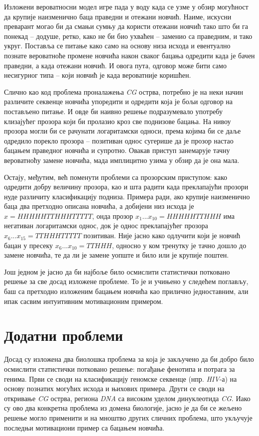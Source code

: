 \documentclass[12pt,oneside]{memoir}
\begin{document}
\begin{CJK}{UTF8}{ipxm}
Изложени вероватносни модел игре пада у воду када се узме у обзир могућност да крупије наизменично баца праведни и отежани новчић. Наиме, искусни преварант могао би да смањи сумњу да користи отежани новчић тако што би га понекад -- додуше, ретко, како не би био ухваћен -- заменио са праведним, и тако укруг. Поставља се питање како само на основу низа исхода и евентуално познате вероватноће промене новчића након сваког бацања одредити када је бачен праведни, а када отежани новчић. И овога пута, одговор може бити само несигурног типа -- који новчић је када вероватније коришћен.

Слично као код проблема проналажења \textit{CG} острва, потребно је на неки начин различите секвенце новчића упоредити и одредити која је бољи одговор на постављено питање. И овде би наивно решење подразумевало употребу клизајућег прозора који би пролазио кроз све поднизове бацања. На нивоу прозора могли би се рачунати логаритамски односи, према којима би се даље одредило порекло прозора -- позитиван однос сугерише да је прозор настао бацањем праведног новчића и супротно. Овакав приступ занемарује тачну вероватноћу замене новчића, мада имплицитно узима у обзир да је она мала.

Остају, међутим, већ поменути проблеми са прозорским приступом: како одредити добру величину прозора, као и шта радити када преклапајући прозори нуде различиту класификацију подниза. Примера ради, ако крупије наизменично баца два претходно описана новчића, а добијени низ исхода је $x = HHHHHTTHHHTTTTT$, онда прозор $x_1...x_{10} = HHHHHTTHHH$ има негативан логаритамски однос, док је однос преклапајућег прозора $x_6...x_{15} = TTHHHTTTTT$ позитиван. Није јасно како одлучити који је новчић бацан у пресеку $x_6...x_{10} = TTHHH$, односно у ком тренутку је тачно дошло до замене новчића, те да ли је замене уопште и било или је крупије поштен.

Још једном је јасно да би најбоље било осмислити статистички потковано решење за све досад изложене проблеме. То је и учињено у следећем поглављу, баш са претходно изложеним бацањем новчића као прилично једноставним, али ипак сасвим интуитивним мотивационим примером.

\section{Додатни проблеми}
Досад су изложена два биолошка проблема за која је закључено да би добро било осмислити статистички потковано решење: погађање фенотипа и потрага за генима. Први се своди на класификацију геномске секвенце (нпр. \textit{HIV}-а) на основу познатих могућих исхода и њихових примера. Други се своди на откривање \textit{CG} острва, региона \textit{DNA} са високим уделом динуклеотида \textit{CG}. Иако су ово два конкретна проблема из домена биологије, јасно је да би се жељено решење могло применити и на мноштво других сличних проблема, што укључује последњи мотивациони пример са бацањем новчића.


\end{CJK}
\end{document}
